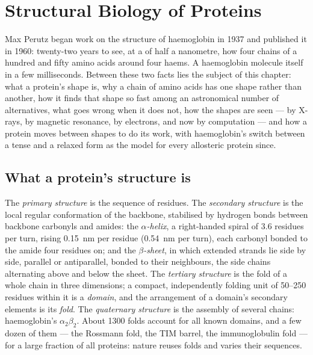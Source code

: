 \chapter{Structural Biology of Proteins}\label{ch:b3:structural-biology}

Max Perutz began work on the structure of haemoglobin in 1937 and
published it in 1960: twenty-two years to see, at a  of half
a nanometre, how four chains of a hundred and fifty amino acids 
around four haems. A haemoglobin molecule  itself in a few
milliseconds. Between these two facts lies the subject of this
chapter: what a protein's shape is, why a chain of amino acids has one
shape rather than another, how it finds that shape so fast among an
astronomical number of alternatives, what goes wrong when it does not,
how the shapes are seen --- by X-rays, by magnetic resonance, by
electrons, and now by computation --- and how a protein moves between
shapes to do its work, with haemoglobin's switch between a tense and a
relaxed form as the model for every allosteric protein since.

\section{What a protein's structure is}

\begin{definition}\label{def:b3:structural-biology:levels}
The \emph{primary structure} is the sequence of residues. The
\emph{secondary structure} is the local regular conformation of the
backbone, stabilised by hydrogen bonds between backbone carbonyls and
amides: the \emph{$\alpha$-helix}, a right-handed spiral of $3.6$
residues per turn, rising \qty{0.15}{nm} per residue (\qty{0.54}{nm}
per turn), each carbonyl bonded to the amide four residues on; and the
\emph{$\beta$-sheet}, in which extended strands lie side by side,
parallel or antiparallel, bonded to their neighbours, the side chains
alternating above and below the sheet. The \emph{tertiary structure} is
the fold of a whole chain in three dimensions; a compact, independently
folding unit of \numrange{50}{250} residues within it is a \emph{domain},
and the arrangement of a domain's secondary elements is its \emph{fold}.
The \emph{quaternary structure} is the assembly of several chains:
haemoglobin's $\alpha_{2}\beta_{2}$. About \num{1300} folds account for
all known domains, and a few dozen of them --- the Rossmann fold, the
TIM barrel, the immunoglobulin fold --- for a large fraction of all
proteins: nature reuses folds and varies their sequences.
\end{definition}

